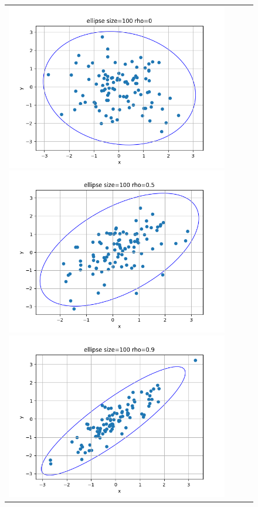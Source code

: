 \begin{figure}[H]
	\begin{tabular}{cccc}
		\includegraphics[scale=0.3]{ellipse_100_0.png}
		\includegraphics[scale=0.3]{ellipse_100_0.5.png}
		\includegraphics[scale=0.3]{ellipse_100_0.9.png}

\end{tabular}
\end{figure}
